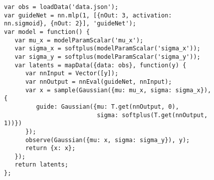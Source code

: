 \begin{figure}

\begin{minipage}{\linewidth}
\begin{minipage}{0.66\linewidth}
\begin{lstlisting}[style=smaller]
var obs = loadData('data.json');
var guideNet = nn.mlp(1, [{nOut: 3, activation: nn.sigmoid}, {nOut: 2}], 'guideNet');
var model = function() {
   var mu_x = modelParamScalar('mu_x');
   var sigma_x = softplus(modelParamScalar('sigma_x'));
   var sigma_y = softplus(modelParamScalar('sigma_y'));
   var latents = mapData({data: obs}, function(y) {
      var nnInput = Vector([y]);
      var nnOutput = nnEval(guideNet, nnInput);
      var x = sample(Gaussian({mu: mu_x, sigma: sigma_x}), {
         guide: Gaussian({mu: T.get(nnOutput, 0),
                          sigma: softplus(T.get(nnOutput, 1))})
      });
      observe(Gaussian({mu: x, sigma: sigma_y}), y);
      return {x: x};
   });
   return latents;
};
\end{lstlisting}
\end{minipage}
%
\begin{minipage}{0.33\linewidth}
\begin{flushright}
\end{flushright}
\end{minipage}
\end{minipage}


\end{figure}
